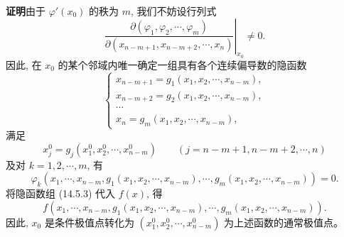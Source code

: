 \documentclass[UTF8,12pt,a4paper,fontset=fandol]{ctexart}
\begin{document}
\noindent\textbf{证明}\quad 由于 $\varphi'(x_0)$ 的秩为 $m$, 我们不妨设行列式
\[
  \left.
  \frac{\partial(\varphi_1,\varphi_2,\cdots,\varphi_m)}
       {\partial(x_{n-m+1},x_{n-m+2},\cdots,x_n)}
  \right|_{x_0}
  \ne0.
\]
因此, 在 $x_0$ 的某个邻域内唯一确定一组具有各个连续偏导数的隐函数
\begin{equation}
  \begin{cases}
    x_{n-m+1}=g_1(x_1,x_2,\cdots,x_{n-m}),\\
    x_{n-m+2}=g_2(x_1,x_2,\cdots,x_{n-m}),\\
    \cdots\\
    x_n=g_m(x_1,x_2,\cdots,x_{n-m}),
  \end{cases}
  \tag{14.5.3}
\end{equation}
满足
\[
  x_j^0=g_j(x_1^0,x_2^0,\cdots,x_{n-m}^0)
  \qquad (j=n-m+1,n-m+2,\cdots,n)
\]
及对 $k=1,2,\cdots,m$, 有
\[
  \varphi_k(x_1,\cdots,x_{n-m},g_1(x_1,x_2,\cdots,x_{n-m}),\cdots,g_m(x_1,x_2,\cdots,x_{n-m}))=0.
\]
将隐函数组 (14.5.3) 代入 $f(x)$, 得
\[
  f(x_1,\cdots,x_{n-m},g_1(x_1,x_2,\cdots,x_{n-m}),\cdots,g_m(x_1,x_2,\cdots,x_{n-m})).
\]
因此, $x_0$ 是条件极值点转化为 $(x_1^0,x_2^0,\cdots,x_{n-m}^0)$ 为上述函数的通常极值点。
\end{document}
